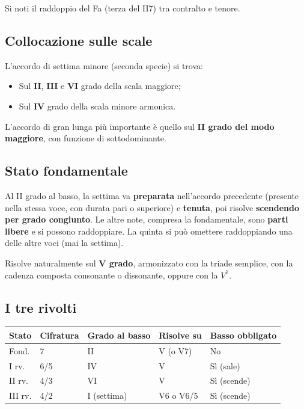 \begin{esempio}[II7 in Do Maggiore]
    Si noti il raddoppio del Fa (terza del II7) tra contralto e tenore.
\end{esempio}

\subsection{Collocazione sulle scale}
\label{subsec:ii7_collocazione}

\begin{regola}
	\label{reg:ii7_gradi}
	L'accordo di settima minore (seconda specie) si trova:
	\begin{itemize}
		\item Sul \textbf{II}, \textbf{III} e \textbf{VI} grado della scala maggiore;
		\item Sul \textbf{IV} grado della scala minore armonica.
	\end{itemize}
	L'accordo di gran lunga più importante è quello sul \textbf{II grado del modo maggiore}, con funzione di sottodominante.
\end{regola}

\subsection{Stato fondamentale}
\label{subsec:ii7_stato_fondamentale}

\begin{regola}
	\label{reg:ii7_stato_fondamentale}
	Al II grado al basso, la settima va \textbf{preparata} nell'accordo precedente (presente nella stessa voce, con durata pari o superiore) e \textbf{tenuta}, poi risolve \textbf{scendendo per grado congiunto}. Le altre note, compresa la fondamentale, sono \textbf{parti libere} e si possono raddoppiare. La quinta si può omettere raddoppiando una delle altre voci (mai la settima).
\end{regola}

Risolve naturalmente sul \textbf{V grado}, armonizzato con la triade semplice, con la cadenza composta consonante o dissonante, oppure con la $V^7$.

\subsection{I tre rivolti}
\label{subsec:ii7_rivolti}

\begin{center}
\begin{tabular}{|l|l|l|l|l|}
\hline
Stato & Cifratura & Grado al basso & Risolve su & Basso obbligato \\
\hline
Fond. & 7 & II & V (o V7) & No \\
I rv. & 6/5 & IV & V & Sì (sale) \\
II rv. & 4/3 & VI & V & Sì (scende) \\
III rv. & 4/2 & I (settima) & V6 o V6/5 & Sì (scende) \\
\hline
\end{tabular}
\end{center}

